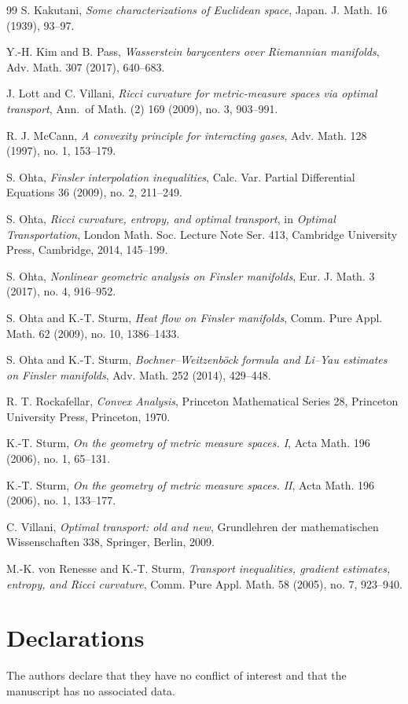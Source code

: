 \documentclass[a4paper,11pt]{article}
\numberwithin{equation}{section}
\begin{document}
\begin{thebibliography}{99}
		S. Kakutani,
		\emph{Some characterizations of Euclidean space},
		Japan. J. Math. 16 (1939), 93--97.
		
		
		
		
		Y.-H. Kim and B. Pass,
		\emph{Wasserstein barycenters over Riemannian manifolds},
		Adv. Math. 307 (2017), 640--683.
		
		J. Lott and C. Villani,
		\emph{Ricci curvature for metric-measure spaces via optimal transport},
		Ann.\ of Math. (2) 169 (2009), no. 3, 903--991.
		
		
		
		R. J. McCann,
		\emph{A convexity principle for interacting gases},
		Adv. Math. 128 (1997), no. 1, 153--179.
		
		S. Ohta,
		\emph{Finsler interpolation inequalities},
		Calc. Var. Partial Differential Equations 36 (2009), no. 2, 211--249.
		
		S. Ohta,
		\emph{Ricci curvature, entropy, and optimal transport},
		in \emph{Optimal Transportation}, London Math. Soc. Lecture Note Ser. 413,
		Cambridge University Press, Cambridge, 2014, 145--199.
		
		S. Ohta,
		\emph{Nonlinear geometric analysis on Finsler manifolds},
		Eur. J. Math. 3 (2017), no. 4, 916--952.
		
		S. Ohta and K.-T. Sturm,
		\emph{Heat flow on Finsler manifolds},
		Comm. Pure Appl. Math. 62 (2009), no. 10, 1386--1433.
		
		S. Ohta and K.-T. Sturm,
		\emph{Bochner--Weitzenb\"ock formula and Li--Yau estimates on Finsler manifolds},
		Adv. Math. 252 (2014), 429--448.
		
		R. T. Rockafellar,
		\emph{Convex Analysis},
		Princeton Mathematical Series 28, Princeton University Press, Princeton, 1970.
		
		
		
		
		K.-T. Sturm,
		\emph{On the geometry of metric measure spaces. I},
		Acta Math. 196 (2006), no. 1, 65--131.
		
		K.-T. Sturm,
		\emph{On the geometry of metric measure spaces. II},
		Acta Math. 196 (2006), no. 1, 133--177.
		
		C. Villani,
		\emph{Optimal transport: old and new},
		Grundlehren der mathematischen Wissenschaften 338, Springer, Berlin, 2009.
		
		M.-K. von Renesse and K.-T. Sturm,
		\emph{Transport inequalities, gradient estimates, entropy, and Ricci curvature},
		Comm. Pure Appl. Math. 58 (2005), no. 7, 923--940.
		
	\end{thebibliography}
	

	
	\medskip
	
	\section*{Declarations}\label{sec:declarations}
	The authors declare that they have no conflict of interest and that the manuscript has no associated data.
\end{document}
